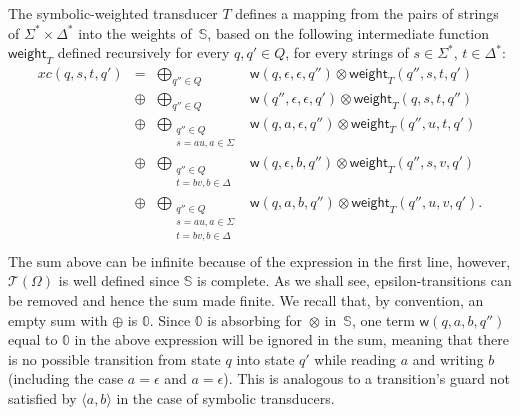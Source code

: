 \documentclass[runningheads]{llncs}
\def\<#1>{\langle #1 \rangle}
\newcommand{\T}{\mathcal{T}}
\newcommand{\Semiring}{\mathbb{S}}
\newcommand{\zero}{\mathbb{0}}
\def\weight{\mathsf{weight}}
\def\wei{\mathsf{w}}
\begin{document}
The symbolic-weighted transducer $T$ defines a mapping 
from the pairs of strings of $\Sigma^* \times \Delta^*$ 
into the weights of~$\Semiring$,
based on the following intermediate function $\weight_T$
defined recursively for every $q, q' \in Q$, 
for every strings of $s \in \Sigma^*$, $t \in \Delta^*$:
\[
\begin{array}{rccl}
xc(q, s, t, q') & = & 
   \displaystyle\bigoplus_{q'' \in Q} &
   \wei(q, \epsilon, \epsilon, q'') \otimes \weight_T(q'', s, t, q')\\
   & \oplus & \displaystyle\bigoplus_{q'' \in Q} &
              \wei(q'', \epsilon, \epsilon, q') \otimes \weight_T(q, s, t, q'')\\
 & \oplus & \displaystyle\bigoplus_{\begin{array}{c}
                                      \scriptstyle q'' \in Q\\[-2pt]
                                      \scriptstyle s = au, a \in \Sigma
                                      \end{array}} &
   \wei(q, a, \epsilon, q'') \otimes \weight_T(q'', u, t, q')\\
 & \oplus & \displaystyle\bigoplus_{\begin{array}{c}
                                    \scriptstyle q'' \in Q\\[-2pt]
                                    \scriptstyle t = bv, b \in \Delta
                                    \end{array}} &
    \wei(q, \epsilon, b, q'') \otimes \weight_T(q'', s, v, q')\\ 
 & \oplus & \displaystyle\bigoplus_{\begin{array}{c}
                                    \scriptstyle q'' \in Q\\[-2pt]
                                    \scriptstyle s = au, a \in \Sigma\\[-2pt]
                                    \scriptstyle t = bv, b \in \Delta
                                    \end{array}} &
   \wei(q, a, b, q'') \otimes \weight_T(q'', u, v, q').\\ 
\end{array}
\]
The sum above can be infinite because of the expression in the first line, 
however, $\T(\Omega)$ is well defined since $\Semiring$ is complete.
%
As we shall see, epsilon-transitions can be removed and hence the sum made finite.
%
We recall that, by convention, an empty sum with $\oplus$ is $\zero$. 
%
Since $\zero$ is absorbing for~$\otimes$ in~$\Semiring$,
one term $\wei(q, a, b, q'')$ equal to $\zero$ in the above expression 
will be ignored in the sum, meaning that there is no possible transition
from state $q$ into state $q'$ while reading $a$ and writing $b$ 
(including the case $a = \epsilon$ and $a = \epsilon$).
This is analogous to a transition's guard not satisfied by $\<a, b>$ in 
the case of symbolic transducers.
\end{document}
